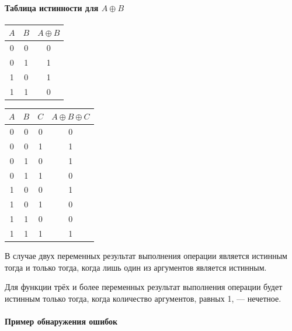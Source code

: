 \paragraph{Таблица истинности для \texorpdfstring{$A \oplus B$}{A xor B}}\label{par:parity-xor-truth-table}

\noindent
\begin{minipage}[t]{.45\linewidth}
    \vspace*{0mm}
    \centering
    \begin{tabular}{|c|c|c|}
    \hline
    $A$ & $B$ & $A \oplus B$ \\ \hline
    0 & 0 & 0 \\
    0 & 1 & 1 \\
    1 & 0 & 1 \\
    1 & 1 & 0 \\ \hline
    \end{tabular}
\end{minipage}
\hfill
\begin{minipage}[t]{.45\linewidth}
    \vspace*{0mm}
    \centering
    \begin{tabular}{|c|c|c|c|}
    \hline
    $A$ & $B$ & $C$ & $A \oplus B \oplus C$ \\\hline
    0 & 0 & 0 & 0 \\
    0 & 0 & 1 & 1 \\
    0 & 1 & 0 & 1 \\
    0 & 1 & 1 & 0 \\
    1 & 0 & 0 & 1 \\
    1 & 0 & 1 & 0 \\
    1 & 1 & 0 & 0 \\
    1 & 1 & 1 & 1 \\     \hline
    \end{tabular}
\end{minipage}

\bigskip\noindent
В случае двух переменных результат выполнения операции является истинным тогда и только тогда, когда лишь один из аргументов является истинным.

\noindent Для функции трёх и более переменных результат выполнения операции будет истинным только тогда, когда количество аргументов, равных 1, --- нечетное.

\paragraph{Пример обнаружения ошибок}\label{par:parity-error-detection-example}

